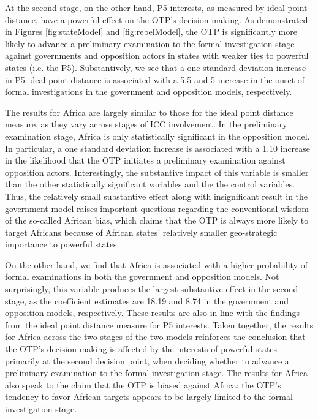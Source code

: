 At the second stage, on the other hand, P5 interests, as measured by ideal point distance, have a powerful effect on the OTP's decision-making. As demonstrated in Figures \ref{fig:stateModel} and \ref{fig:rebelModel}, the OTP is significantly more likely to advance a preliminary examination to the formal investigation stage against governments and opposition actors in states with weaker ties to powerful states (i.e. the P5). Substantively, we see that a one standard deviation increase in P5 ideal point distance is associated with a 5.5 and 5 increase in the onset of formal investigations in the government and opposition models, respectively.

The results for Africa are largely similar to those for the ideal point distance measure, as they vary across stages of ICC involvement. In the preliminary examination stage, Africa is only statistically significant in the opposition model. In particular, a one standard deviation increase is associated with a 1.10 increase in the likelihood that the OTP initiates a preliminary examination against opposition actors. Interestingly, the substantive impact of this variable is smaller than the other statistically significant variables and the the control variables. Thus, the relatively small substantive effect along with insignificant result in the government model raises important questions regarding the conventional wisdom of the so-called African bias, which claims that the OTP is always more likely to target Africans because of African states' relatively smaller geo-strategic importance to powerful states.

On the other hand, we find that Africa is associated with a higher probability of formal examinations in both the government and opposition models. Not surprisingly, this variable produces the largest substantive effect in the second stage, as the coefficient estimates are 18.19 and 8.74 in the government and opposition models, respectively. These results are also in line with the findings from the ideal point distance measure for P5 interests. Taken together, the results for Africa across the two stages of the two models reinforces the conclusion that the OTP's decision-making is affected by the interests of powerful states primarily at the second decision point, when deciding whether to advance a preliminary examination to the formal investigation stage. The results for Africa also speak to the claim that the OTP is biased against Africa: the OTP's tendency to favor African targets appears to be largely limited to the formal investigation stage.

